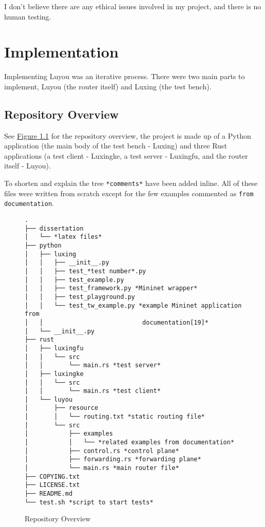 \documentclass[12pt,a4paper,twoside,openany]{report}
\begin{document}
\bigskip

I don't believe there are any ethical issues involved in my project, and there is no human testing.

\chapter{Implementation}
\label{chap::implementation}

Implementing Luyou was an iterative process.  There were two main parts to implement, Luyou (the router itself) and Luxing (the test bench).

\section*{Repository Overview}

See \hyperref[fig::repository_overview]{Figure }\ref{fig::repository_overview} for the repository overview, the project is made up of a Python application (the main body of the test bench - Luxing) and three Rust applications (a test client - Luxingke, a test server - Luxingfu, and the router itself - Luyou). 

To shorten and explain the tree \verb!*comments*! have been added inline. All of these files were written from scratch except for the few examples commented as \verb!from documentation!. 

\begin{figure}
\begin{lstlisting}[style=tree]
.
├── dissertation
│   └── *latex files*
├── python
│   ├── luxing
│   │   ├── __init__.py
│   │   ├── test_*test number*.py
│   │   ├── test_example.py
│   │   ├── test_framework.py *Mininet wrapper*
│   │   ├── test_playground.py 
│   │   └── test_tw_example.py *example Mininet application from
│   │                           documentation[19]*
│   └── __init__.py
├── rust
│   ├── luxingfu
│   │   └── src
│   │       └── main.rs *test server*
│   ├── luxingke
│   │   └── src
│   │       └── main.rs *test client*
│   └── luyou
│       ├── resource
│       │   └── routing.txt *static routing file*
│       └── src
│           ├── examples
│           │   └── *related examples from documentation*
│           ├── control.rs *control plane*
│           ├── forwarding.rs *forwarding plane*
│           └── main.rs *main router file*
├── COPYING.txt
├── LICENSE.txt
├── README.md
└── test.sh *script to start tests*
\end{lstlisting}
\caption{Repository Overview}
\label{fig::repository_overview}
\end{figure}
\end{document}
